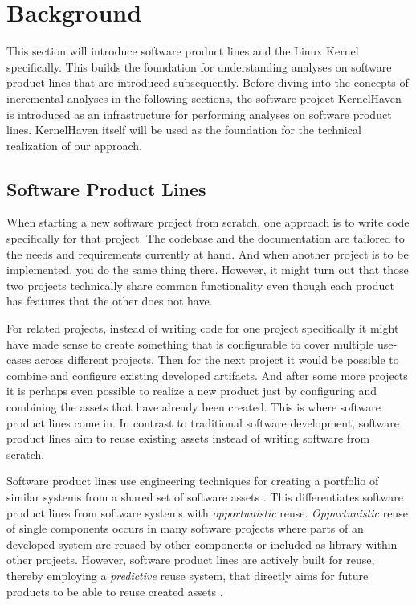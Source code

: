 \documentclass[a4paper]{article}
\begin{document}
\clearpage
\section{Background} \label{background}

This section will introduce software product lines and the Linux Kernel specifically. This builds the foundation for understanding analyses on software product lines that are introduced subsequently. Before diving into the concepts of incremental analyses in the following sections, the software project KernelHaven is introduced as an infrastructure for performing analyses on software product lines. KernelHaven itself will be used as the foundation for the technical realization of our approach.

\subsection{Software Product Lines}\label{spl}

When starting a new software project from scratch, one approach is to write code specifically for that project. The codebase and the documentation are tailored to the needs and requirements currently at hand. And when another project is to be implemented, you do the same thing there. However, it might turn out that those two projects technically share common functionality even though each product has features that the other does not have.

For related projects, instead of writing code for one project specifically it might have made sense to create something that is configurable to cover multiple use-cases across different projects. Then for the next project it would be possible to combine and configure existing developed artifacts. And after some more projects it is perhaps even possible to realize a new product just by configuring and combining the assets that have already been created. This is where software product lines come in. In contrast to traditional software development, software product lines aim to reuse existing assets instead of writing software from scratch.

Software product lines use engineering techniques for creating a portfolio of similar systems from a shared set of software assets \cite{Intro}. This differentiates software product lines from software systems with \emph{opportunistic} reuse. \emph{Oppurtunistic} reuse of single components occurs in many software projects where parts of an developed system are reused by other components or included as library within other projects. However, software product lines are actively built for reuse, thereby employing a \emph{predictive} reuse system, that directly aims for future products to be able to reuse created assets \cite{Intro}.
\end{document}
